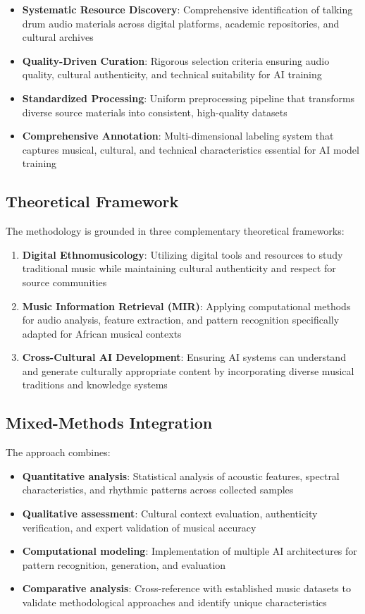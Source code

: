 \documentclass[12pt]{article}
\begin{document}
\begin{itemize}
    \item \textbf{Systematic Resource Discovery}: Comprehensive identification of talking drum audio materials across digital platforms, academic repositories, and cultural archives
    \item \textbf{Quality-Driven Curation}: Rigorous selection criteria ensuring audio quality, cultural authenticity, and technical suitability for AI training
    \item \textbf{Standardized Processing}: Uniform preprocessing pipeline that transforms diverse source materials into consistent, high-quality datasets
    \item \textbf{Comprehensive Annotation}: Multi-dimensional labeling system that captures musical, cultural, and technical characteristics essential for AI model training
\end{itemize}

\subsection{Theoretical Framework}

The methodology is grounded in three complementary theoretical frameworks:
\begin{enumerate}
    \item \textbf{Digital Ethnomusicology}: Utilizing digital tools and resources to study traditional music while maintaining cultural authenticity and respect for source communities
    \item \textbf{Music Information Retrieval (MIR)}: Applying computational methods for audio analysis, feature extraction, and pattern recognition specifically adapted for African musical contexts
    \item \textbf{Cross-Cultural AI Development}: Ensuring AI systems can understand and generate culturally appropriate content by incorporating diverse musical traditions and knowledge systems
\end{enumerate}

\subsection{Mixed-Methods Integration}

The approach combines:
\begin{itemize}
    \item \textbf{Quantitative analysis}: Statistical analysis of acoustic features, spectral characteristics, and rhythmic patterns across collected samples
    \item \textbf{Qualitative assessment}: Cultural context evaluation, authenticity verification, and expert validation of musical accuracy
    \item \textbf{Computational modeling}: Implementation of multiple AI architectures for pattern recognition, generation, and evaluation
    \item \textbf{Comparative analysis}: Cross-reference with established music datasets to validate methodological approaches and identify unique characteristics
\end{itemize}
\end{document}
